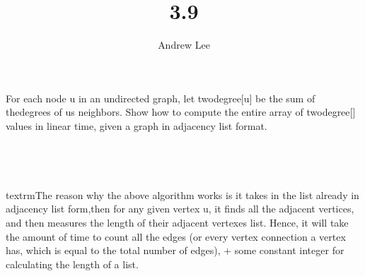 \documentclass[10pt,a4paper,oneside]{article}
\begin{document}
\title{3.9}\author{Andrew Lee}\maketitle{}
\textrm{For each node u in an undirected graph, let } twodegree[u] \textrm{ be the sum of the\newline degrees of u\’s neighbors. Show how to compute the entire array of\newline}\textrm{ twodegree[\·] values in linear time, given a graph in adjacency list format.}\\\\



\newline\\\\\\textrm{The reason why the above algorithm works is it takes in the list already in adjacency list form,\newline then for any given vertex u, it finds all the adjacent vertices, and then measures the length \newline of their adjacent vertexes list. Hence, it will take the amount of time to count all the edges (or every vertex connection a vertex has, which is equal to the total number of edges), + some constant integer \newline for calculating the length of a list.}
\end{document}
